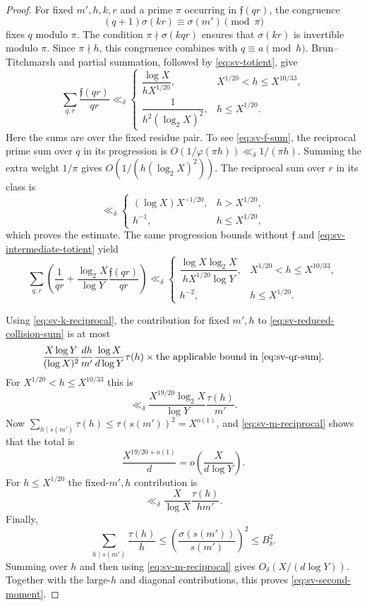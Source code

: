 \documentclass[11pt]{article}
\theoremstyle{remark}
\newcommand{\1}{\mathbf 1}
\begin{document}
\begin{proof}
For fixed $m',h,k,r$ and a prime $\pi$ occurring in
$\mathfrak f(qr)$, the congruence
\[
 (q+1)\sigma(kr)\equiv\sigma(m')\pmod\pi
\]
fixes $q$ modulo $\pi$.  The condition
$\pi\nmid\sigma(kqr)$ ensures that $\sigma(kr)$ is invertible modulo
$\pi$.  Since $\pi\nmid h$, this congruence combines with
$q\equiv a\pmod h$.  Brun--Titchmarsh and partial summation, followed by
\eqref{eq:sv-totient}, give
\begin{equation}\label{eq:sv-f-sum}
 \sum_{q,r}\frac{\mathfrak f(qr)}{qr}
 \ll_\delta
 \begin{cases}
  \dfrac{\log X}{hX^{1/20}},&X^{1/20}<h\leq X^{10/33},\\[6pt]
  \dfrac{1}{h^2(\log_2X)^2},&h\leq X^{1/20}.
 \end{cases}
\end{equation}
Here the sums are over the fixed residue pair.  To see
\eqref{eq:sv-f-sum}, the reciprocal prime sum over $q$ in its progression
is $O(1/\varphi(\pi h))\ll_\delta1/(\pi h)$.  Summing the extra weight
$1/\pi$ gives $O(1/(h(\log_2X)^2))$.  The reciprocal sum over $r$ in its
class is
\[
 \ll_\delta
 \begin{cases}
  (\log X)X^{-1/20},&h>X^{1/20},\\
  h^{-1},&h\leq X^{1/20},
 \end{cases}
\]
which proves the estimate.  The same progression bounds without
$\mathfrak f$ and \eqref{eq:sv-intermediate-totient} yield
\begin{equation}\label{eq:sv-qr-sum}
 \sum_{q,r}\left(\frac1{qr}
 +\frac{\log_2X}{\log Y}\frac{\mathfrak f(qr)}{qr}\right)
 \ll_\delta
 \begin{cases}
  \dfrac{\log X\log_2X}{hX^{1/20}\log Y},
       &X^{1/20}<h\leq X^{10/33},\\[6pt]
  h^{-2},&h\leq X^{1/20}.
 \end{cases}
\end{equation}

Using \eqref{eq:sv-k-reciprocal}, the contribution for fixed $m',h$ to
\eqref{eq:sv-reduced-collision-sum} is at most
\[
 \frac{X\log Y}{(\log X)^2}\frac{dh}{m'}
 \frac{\log X}{d\log Y}\tau(h)
 \times\text{the applicable bound in \eqref{eq:sv-qr-sum}}.
\]
For $X^{1/20}<h\leq X^{10/33}$ this is
\[
 \ll_\delta
 \frac{X^{19/20}\log_2X}{\log Y}\frac{\tau(h)}{m'}.
\]
Now $\sum_{h\mid s(m')}\tau(h)\leq\tau(s(m'))^2=X^{o(1)}$, and
\eqref{eq:sv-m-reciprocal} shows that the total is
\[
 \frac{X^{19/20+o(1)}}d
 =o\!\left(\frac{X}{d\log Y}\right).
\]
For $h\leq X^{1/20}$ the fixed-$m',h$ contribution is
\[
 \ll_\delta\frac{X}{\log X}\frac{\tau(h)}{hm'}.
\]
Finally,
\begin{equation}\label{eq:sv-divisor-sum}
 \sum_{h\mid s(m')}\frac{\tau(h)}h
 \leq\left(\frac{\sigma(s(m'))}{s(m')}\right)^2
 \leq B_\delta^2.
\end{equation}
Summing over $h$ and then using \eqref{eq:sv-m-reciprocal} gives
$O_\delta(X/(d\log Y))$.  Together with the large-$h$ and diagonal
contributions, this proves \eqref{eq:sv-second-moment}.
\end{proof}
\end{document}

